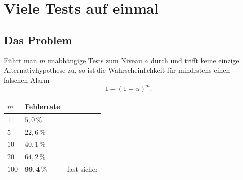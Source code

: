 \chapter{Viele Tests auf einmal}

\section{Das Problem}

\begin{merksatz}
Führt man $m$ unabhängige Tests zum Niveau $\alpha$ durch und trifft keine einzige Alternativhypothese zu, so ist die Wahrscheinlichkeit für mindestens einen falschen Alarm
\[ 1 - (1-\alpha)^m . \]

\begin{center}
{\small
\renewcommand{\arraystretch}{1.48}
\begin{tabular}{@{}P{1.8cm}P{2.4cm}P{3.0cm}@{}}
\toprule
$m$ & \textbf{Fehlerrate} & \\
\midrule
$1$ & $5{,}0\,\%$ & \\
$5$ & $22{,}6\,\%$ & \\
$10$ & $40{,}1\,\%$ & \\
$20$ & $64{,}2\,\%$ & \\
$100$ & \textcolor{akzent}{$\mathbf{99{,}4\,\%}$} & \textcolor{akzent}{fast sicher}\\
\bottomrule
\end{tabular}}
\end{center}

\begin{center}
\begin{minipage}{0.88\textwidth}
\end{minipage}
\end{center}
\end{merksatz}

